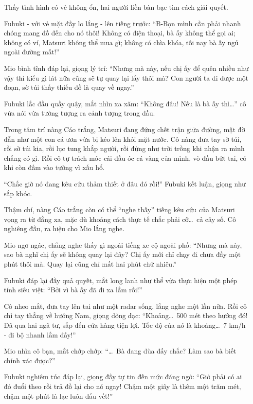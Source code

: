 \documentclass[../main.tex]{subfiles}
\begin{document}
Thấy tình hình có vẻ không ổn, hai người liền bàn bạc tìm cách giải quyết.

Fubuki - với vẻ mặt đầy lo lắng - lên tiếng trước: ``B-Bọn mình cần phải nhanh chóng mang đồ đến cho nó thôi! Không có điện thoại, bà ấy không thể gọi ai; không có ví, Matsuri không thể mua gì; không có chìa khóa, tối nay bà ấy ngủ ngoài đường mất!''

Mio bình tĩnh đáp lại, giọng lý trí: ``Nhưng mà này, nếu chị ấy để quên nhiều như vậy thì kiểu gì lát nữa cũng sẽ tự quay lại lấy thôi mà? Con người ta đi được một đoạn, sờ túi thấy thiếu đồ là quay về ngay.''

Fubuki lắc đầu quầy quậy, mắt nhìn xa xăm: ``Không đâu! Nếu là bà ấy thì\dots'' cô vừa nói vừa tưởng tượng ra cảnh tượng trong đầu.

Trong tâm trí nàng Cáo trắng, Matsuri đang đứng chết trận giữa đường, mặt đờ đẫn như một con cá ươn vừa bị kéo lên khỏi mặt nước. Cô nàng đưa tay sờ túi, rồi sờ túi kia, rồi lục tung khắp người, rồi đứng như trời trồng khi nhận ra mình chẳng có gì. Rồi cô tự trách móc cái đầu óc cá vàng của mình, vò đầu bứt tai, có khi còn đấm vào tường vì xấu hổ.

``Chắc giờ nó đang kêu cứu thảm thiết ở đâu đó rồi!'' Fubuki kết luận, giọng như sắp khóc.


Thậm chí, nàng Cáo trắng còn có thể ``nghe thấy'' tiếng kêu cứu của Matsuri vọng ra từ đằng xa, mặc dù khoảng cách thực tế chắc phải cỡ\dots\ cả cây số. Cô nghiêng đầu, ra hiệu cho Mio lắng nghe.

Mio ngơ ngác, chẳng nghe thấy gì ngoài tiếng xe cộ ngoài phố: ``Nhưng mà này, sao bà nghĩ chị ấy sẽ không quay lại đây? Chị ấy mới chỉ chạy đi chưa đầy một phút thôi mà. Quay lại cũng chỉ mất hai phút chứ nhiêu.''

Fubuki đáp lại đầy quả quyết, mắt long lanh như thể vừa thực hiện một phép tính siêu việt: ``Bởi vì bà ấy đã đi xa lắm rồi!''

Cô nheo mắt, đưa tay lên tai như một radar sống, lắng nghe một lần nữa. Rồi cô chỉ tay thẳng về hướng Nam, giọng dõng dạc: ``Khoảng\dots\ 500 mét theo hướng đó! Đã qua hai ngã tư, sắp đến cửa hàng tiện lợi. Tốc độ của nó là khoảng\dots\ 7 km/h - đi bộ nhanh lắm đấy!''

Mio nhìn cô bạn, mắt chớp chớp: ``\dots\ Bà đang đùa đấy chắc? Làm sao bà biết chính xác được?''

Fubuki nghiêm túc đáp lại, giọng đầy tự tin đến mức đáng ngờ: ``Giờ phải có ai đó đuổi theo rồi trả đồ lại cho nó ngay! Chậm một giây là thêm một trăm mét, chậm một phút là lạc luôn dấu vết!''
\end{document}
